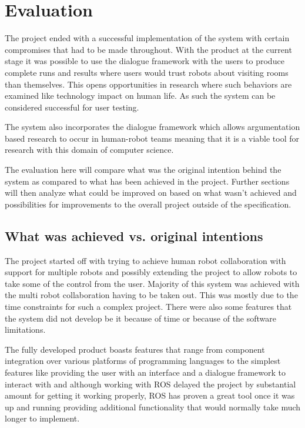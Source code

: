 \chapter{Evaluation}
  The project ended with a successful implementation of the system with certain compromises that had to be made throughout. With the product at the current stage it was possible to use the dialogue framework with the users to produce complete runs and results where users would trust robots about visiting rooms than themselves. This opens opportunities in research where such behaviors are examined like technology impact on human life. As such the system can be considered successful for user testing.

  The system also incorporates the dialogue framework which allows argumentation based research to occur in human-robot teams meaning that it is a viable tool for research with this domain of computer science.

  The evaluation here will compare what was the original intention behind the system as compared to what has been achieved in the project. Further sections will then analyze what could be improved on based on what wasn't achieved and possibilities for improvements to the overall project outside of the specification.

  \section{What was achieved vs. original intentions}
    The project started off with trying to achieve human robot collaboration with support for multiple robots and possibly extending the project to allow robots to take some of the control from the user. Majority of this system was achieved with the multi robot collaboration having to be taken out. This was mostly due to the time constraints for such a complex project. There were also some features that the system did not develop be it because of time or because of the software limitations. 

    The fully developed product boasts features that range from component integration over various platforms of programming languages to the simplest features like providing the user with an interface and a dialogue framework to interact with and although working with ROS delayed the project by substantial amount for getting it working properly, ROS has proven a great tool once it was up and running providing additional functionality that would normally take much longer to implement.

